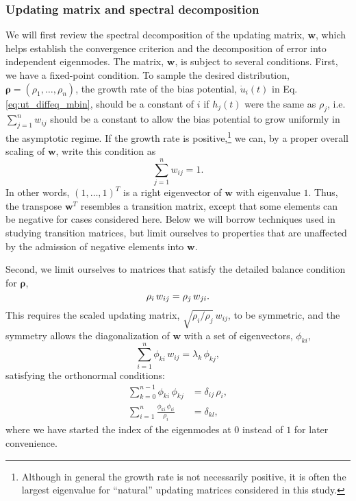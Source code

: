 \documentclass[reprint, superscriptaddress, floatfix]{revtex4-1}
\begin{document}
\subsubsection{\label{sec:updating-matrix}
Updating matrix and spectral decomposition}



We will first review the spectral decomposition
of the updating matrix, $\mathbf w$,
which helps establish the convergence criterion
and the decomposition of error into
independent eigenmodes.
%
The matrix, $\mathbf w$, is subject to several conditions.
%
First, we have a fixed-point condition\cite{bussi2006, dama2014}.
%
To sample the desired distribution,
$\pmb\rho = (\rho_1, \dots, \rho_n)$,
the growth rate of the bias potential,
${\dot u}_i(t)$
in Eq. \eqref{eq:ut_diffeq_mbin},
should be a constant of $i$
if $h_j(t)$ were the same as $\rho_j$,
i.e.
$\sum_{j=1}^n w_{ij}$ should be a constant
to allow the bias potential to grow uniformly
in the asymptotic regime.
%
If the growth rate is positive,\footnote{Although
  in general the growth rate is not necessarily positive,
  it is often the largest eigenvalue
  for ``natural'' updating matrices considered
  in this study.}
we can, by a proper overall scaling of $\mathbf w$,
write this condition as
%
\begin{equation}
  \sum_{j = 1}^n w_{ij} = 1
  .
\label{eq:w_sumj}
\end{equation}
%
In other words, $(1, \dots, 1)^T$
is a right eigenvector of $\mathbf w$
with eigenvalue $1$.
%
Thus, the transpose $\mathbf w^T$
resembles a transition matrix,
except that some elements can be negative
for cases considered here.
%
Below we will %
borrow techniques used
in studying transition matrices\cite{vankampen},
but limit ourselves to properties that are unaffected
by the admission of negative elements into $\mathbf w$.


Second, we limit ourselves to matrices %
that satisfy
the detailed balance condition for $\pmb\rho$,
%
\begin{equation}
  \rho_i \, w_{ij} = \rho_j \, w_{ji}
  .
  \notag
\end{equation}
%
This requires the scaled updating matrix,
$\sqrt{ \rho_i/\rho_j } \, w_{ij}$,
to be symmetric,
and the symmetry allows the diagonalization
of $\mathbf w$ with a set of
eigenvectors, $\phi_{ki}$,
%
\begin{equation}
  \sum_{i = 1}^n \phi_{ki} \, w_{ij}
  =
  \lambda_k \, \phi_{kj}
  ,
\label{eq:eig_w}
\end{equation}
%
satisfying the orthonormal conditions\cite{vankampen}:
%
\begin{align}
  \sum_{k = 0}^{n - 1}
    \phi_{ki} \, \phi_{kj}
  &=
  \delta_{ij} \, \rho_i,
  \label{eq:eig_orthonormal_cols}
  \\
  \sum_{i = 1}^n
    \frac{ \phi_{ki} \, \phi_{li} }
         { \rho_i }
  &=
  \delta_{kl}
  ,
  \label{eq:eig_orthonormal_rows}
\end{align}
%
where we have started the index of the eigenmodes at $0$
instead of $1$ for later convenience.
\end{document}
